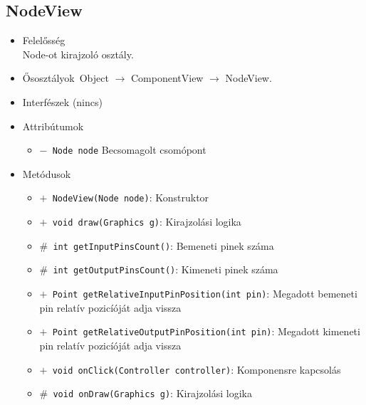 \subsection{NodeView}
\begin{itemize}
\item Felelősség\\
Node-ot kirajzoló osztály.
\item Ősosztályok\ Object $\rightarrow{}$ ComponentView $\rightarrow{}$ NodeView.
\item Interfészek (nincs)
\item Attribútumok $\ $
\begin{itemize}
	\item[] \texttt{$-$ Node node} Becsomagolt csomópont
\end{itemize}
\item Metódusok$\ $
\begin{itemize}
	\item[] \texttt{$+$ NodeView(Node node)}: Konstruktor
	\item[] \texttt{$+$ void draw(Graphics g)}: Kirajzolási logika
	\item[] \texttt{$\#$ int getInputPinsCount()}: Bemeneti pinek száma
	\item[] \texttt{$\#$ int getOutputPinsCount()}: Kimeneti pinek száma
	\item[] \texttt{$+$ Point getRelativeInputPinPosition(int pin)}: Megadott bemeneti pin relatív pozicíóját adja vissza
	\item[] \texttt{$+$ Point getRelativeOutputPinPosition(int pin)}: Megadott kimeneti pin relatív pozicíóját adja vissza
	\item[] \texttt{$+$ void onClick(Controller controller)}: Komponensre kapcsolás
	\item[] \texttt{$\#$ void onDraw(Graphics g)}: Kirajzolási logika
\end{itemize}
\end{itemize}

